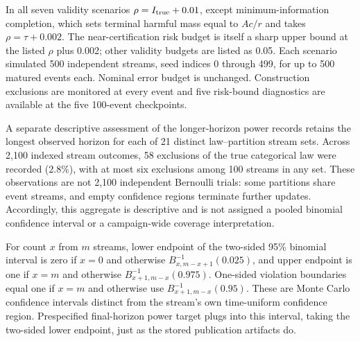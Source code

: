 In all seven validity scenarios $\rho=I_{\rm true}+0.01$, except minimum-information completion, which sets terminal harmful mass equal to $Ac/r$ and takes $\rho=\tau+0.002$. The near-certification risk budget is itself a sharp upper bound at the listed $\rho$ plus 0.002; other validity budgets are listed as 0.05. Each scenario simulated 500 independent streams, seed indices 0 through 499, for up to 500 matured events each. Nominal error budget is unchanged. Construction exclusions are monitored at every event and five risk-bound diagnostics are available at the five 100-event checkpoints.

A separate descriptive assessment of the longer-horizon power records retains the longest observed horizon for each of 21 distinct law--partition stream sets. Across 2,100 indexed stream outcomes, 58 exclusions of the true categorical law were recorded (2.8\%), with at most six exclusions among 100 streams in any set. These observations are not 2,100 independent Bernoulli trials: some partitions share event streams, and empty confidence regions terminate further updates. Accordingly, this aggregate is descriptive and is not assigned a pooled binomial confidence interval or a campaign-wide coverage interpretation.

For count $x$ from $m$ streams, lower endpoint of the two-sided 95\% binomial interval is zero if $x=0$ and otherwise $B^{-1}_{x, m-x+1}(0.025)$, and upper endpoint is one if $x=m$ and otherwise $B^{-1}_{x+1, m-x}(0.975)$. One-sided violation boundaries equal one if $x=m$ and otherwise use $B^{-1}_{x+1, m-x}(0.95)$. These are Monte Carlo confidence intervals distinct from the stream's own time-uniform confidence region. Prespecified final-horizon power target plugs into this interval, taking the two-sided lower endpoint, just as the stored publication artifacts do.

